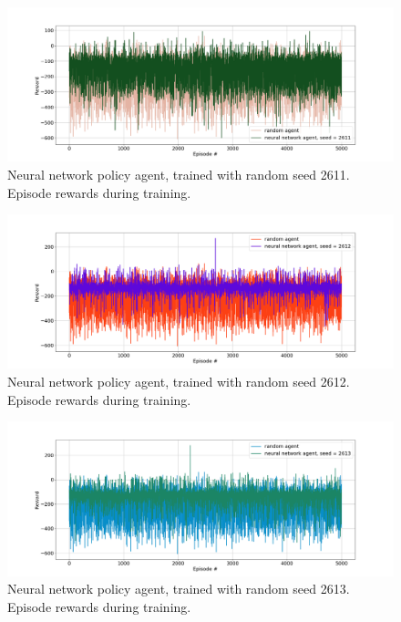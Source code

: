 \documentclass[11pt,a4paper]{article}
\begin{document}
	\begin{figure}
	\begin{center}
		\includegraphics[width = 20cm]{nn_2611.png}
		\caption{Neural network policy agent, trained with random seed 2611. Episode rewards during training.}
		\label{fig:5}
	\end{center}
	\end{figure}

	\begin{figure}
	\begin{center}
		\includegraphics[width = 20cm]{nn_2612.png}
		\caption{Neural network policy agent, trained with random seed 2612. Episode rewards during training.}
		\label{fig:6}
	\end{center}
	\end{figure}
	\begin{figure}
	\begin{center}
		\includegraphics[width = 20cm]{nn_2613.png}
		\caption{Neural network policy agent, trained with random seed 2613. Episode rewards during training.}
		\label{fig:7}
	\end{center}
	\end{figure}
\end{document}
